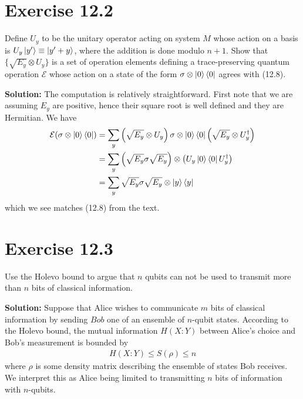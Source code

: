 \documentclass{book}
\newcommand{\mc}[1]{\mathcal{#1}}
\begin{document}
\section*{Exercise 12.2}
    Define $U_y$ to be the unitary operator acting on system $M$ whose action on a basis is $U_y \ket{y'} \equiv \ket{y' + y}$, where the addition is done modulo $n + 1$. Show that $\{\sqrt{E_y} \otimes U_y\}$ is a set of operation elements defining a trace-preserving quantum operation $\mc{E}$ whose action on a state of the form $\sigma \otimes \ket{0}\bra{0}$ agrees with (12.8).
    
    \textbf{Solution:} The computation is relatively straightforward. First note that we are assuming $E_y$ are positive, hence their square root is well defined and they are Hermitian. We have
    \begin{align}
    \begin{aligned}
        \mc{E}(\sigma \otimes \ket{0} \bra{0}) &=\sum_y \left(\sqrt{E_y} \otimes U_y\right) \sigma \otimes \ket{0}\bra{0} \left(\sqrt{E_y} \otimes U_y^\dagger\right) \\
        &= \sum_y \left(\sqrt{E_y} \sigma \sqrt{E_y}\right) \otimes \left(U_y \ket{0}\bra{0} U_y^\dagger\right) \\
        &= \sum_y \sqrt{E_y} \sigma \sqrt{E_y} \otimes \ket{y}\bra{y}
    \end{aligned}
    \end{align}
    which we see matches (12.8) from the text.
    
\section*{Exercise 12.3}
    Use the Holevo bound to argue that $n$ qubits can not be used to transmit more than $n$ bits of classical information.
    
    \textbf{Solution:} Suppose that Alice wishes to communicate $m$ bits of classical information by sending $Bob$ one of an ensemble of $n$-qubit states. According to the Holevo bound, the mutual information $H(X:Y)$ between Alice's choice and Bob's measurement is bounded by
    \begin{align}
        H(X:Y) \leq S(\rho) \leq n
    \end{align}
    where $\rho$ is some density matrix describing the ensemble of states Bob receives. We interpret this as Alice being limited to transmitting $n$ bits of information with $n$-qubits.
    
\end{document}

